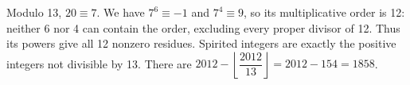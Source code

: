 Modulo 13, $20\equiv7$. We have $7^6\equiv-1$ and $7^4\equiv9$, so its multiplicative order is 12: neither 6 nor 4 can contain the order, excluding every proper divisor of 12. Thus its powers give all 12 nonzero residues. Spirited integers are exactly the positive integers not divisible by 13. There are $2012-\left\lfloor\dfrac{2012}{13}\right\rfloor=2012-154=\boxed{1858}$.
